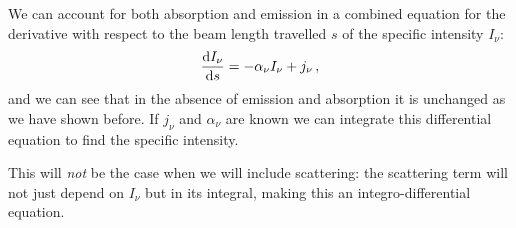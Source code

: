 \documentclass[main.tex]{subfiles}
\begin{document}
We can account for both absorption and emission in a combined equation for the derivative with respect to the beam length travelled \(s\) of the specific intensity \(I_{\nu }\): 
%
\begin{align}
\dv{I_{\nu }}{s} = - \alpha_{\nu } I_{\nu } + j_{\nu }
\,,
\end{align}
%
and we can see that in the absence of emission and absorption it is unchanged as we have shown before.
If \(j_{\nu }\) and \(\alpha_{\nu }\) are known we can integrate this differential equation to find the specific intensity. 

This will \emph{not} be the case when we will include scattering: the scattering term will not just depend on \(I_{\nu }\) but in its integral, making this an integro-differential equation. 
\end{document}
